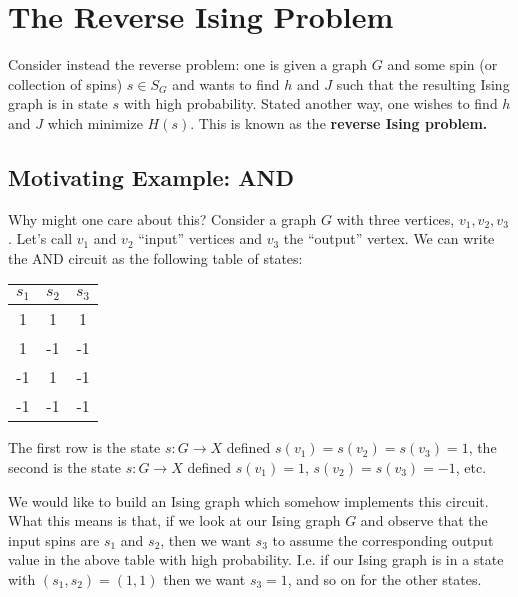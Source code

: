 \documentclass[raggedright, nofonts, notitlepage, openany, debug]{tufte-book}
\begin{document}
\section{The Reverse Ising Problem}
Consider instead the reverse problem: one is given a graph $G$ and some spin (or collection of spins) $s \in S_G$ and wants to find $h$ and $J$ such that the resulting Ising graph is in state $s$ with high probability. Stated another way, one wishes to find $h$ and $J$ which minimize $H(s)$. This is known as the \textbf{reverse Ising problem.}

\subsection{Motivating Example: AND}
Why might one care about this? Consider a graph $G$ with three vertices, $v_1,v_2,v_3$. Let's call $v_1$ and $v_2$ ``input'' vertices and $v_3$ the ``output'' vertex. We can write the AND circuit as the following table of states:
\begin{center}
\begin{tabular}{c | c || c}
  $s_1$ & $s_2$ & $s_3$ \\
  \hline
  1 & 1 & 1 \\
  1 & -1 & -1 \\
  -1 & 1 & -1 \\
  -1 & -1 & -1 \\
\end{tabular}
\end{center}
The first row is the state $s:G\to X$ defined $s(v_1) = s(v_2) = s(v_3) = 1$, the second is the state $s:G\to X$ defined $s(v_1) = 1$, $s(v_2) = s(v_3) = -1$, etc.

We would like to build an Ising graph which somehow implements this circuit. What this means is that, if we look at our Ising graph $G$ and observe that the input spins are $s_1$ and $s_2$, then we want $s_3$ to assume the corresponding output value in the above table with high probability. I.e. if our Ising graph is in a state with $(s_1,s_2) = (1,1)$ then we want $s_3 = 1$, and so on for the other states.
\end{document}
